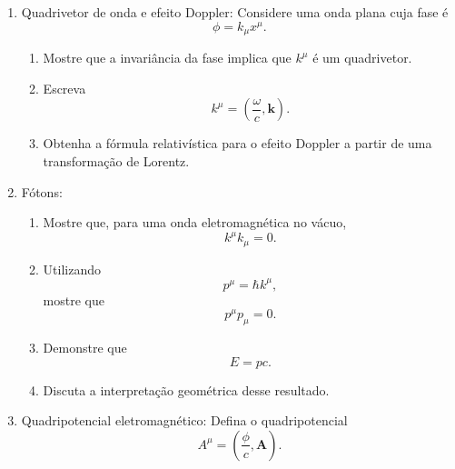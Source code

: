 \begin{enumerate}
      \item Quadrivetor de onda e efeito Doppler: Considere uma onda plana cuja fase é
            $$
                  \phi=k_\mu x^\mu.
            $$

            \begin{enumerate}
                  \item Mostre que a invariância da fase implica que $k^\mu$ é um
                        quadrivetor.

                  \item Escreva
                        $$
                              k^\mu=
                              \left(
                              \frac{\omega}{c},
                              \mathbf k
                              \right).
                        $$

                  \item Obtenha a fórmula relativística para o efeito Doppler a partir
                        de uma transformação de Lorentz.
            \end{enumerate}

      \item Fótons:

            \begin{enumerate}
                  \item Mostre que, para uma onda eletromagnética no vácuo,
                        $$
                              k^\mu k_\mu=0.
                        $$

                  \item Utilizando
                        $$
                              p^\mu=\hbar k^\mu,
                        $$
                        mostre que
                        $$
                              p^\mu p_\mu=0.
                        $$

                  \item Demonstre que
                        $$
                              E=pc.
                        $$

                  \item Discuta a interpretação geométrica desse resultado.
            \end{enumerate}

      \item Quadripotencial eletromagnético: Defina o quadripotencial
            $$
                  A^\mu=
                  \left(
                  \frac{\phi}{c},
                  \mathbf A
                  \right).
            $$


\end{enumerate}
